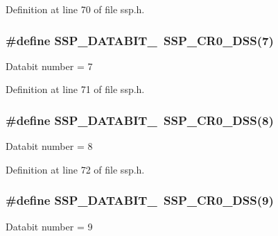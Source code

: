 Definition at line 70 of file ssp.\+h.

\subsubsection[{\texorpdfstring{S\+S\+P\+\_\+\+D\+A\+T\+A\+B\+I\+T\+\_\+7}{SSP_DATABIT_7}}]{\setlength{\rightskip}{0pt plus 5cm}\#define S\+S\+P\+\_\+\+D\+A\+T\+A\+B\+I\+T\+\_~{\bf S\+S\+P\+\_\+\+C\+R0\+\_\+\+D\+SS}(7)}\hypertarget{group___s_s_p___public___macros_ga22e347ea7a0a898ff97b6ca200aa5cd0}{}\label{group___s_s_p___public___macros_ga22e347ea7a0a898ff97b6ca200aa5cd0}
Databit number = 7 

Definition at line 71 of file ssp.\+h.

\subsubsection[{\texorpdfstring{S\+S\+P\+\_\+\+D\+A\+T\+A\+B\+I\+T\+\_\+8}{SSP_DATABIT_8}}]{\setlength{\rightskip}{0pt plus 5cm}\#define S\+S\+P\+\_\+\+D\+A\+T\+A\+B\+I\+T\+\_~{\bf S\+S\+P\+\_\+\+C\+R0\+\_\+\+D\+SS}(8)}\hypertarget{group___s_s_p___public___macros_gad5351b3c8a625149e6ff44bf96c0c71b}{}\label{group___s_s_p___public___macros_gad5351b3c8a625149e6ff44bf96c0c71b}
Databit number = 8 

Definition at line 72 of file ssp.\+h.

\subsubsection[{\texorpdfstring{S\+S\+P\+\_\+\+D\+A\+T\+A\+B\+I\+T\+\_\+9}{SSP_DATABIT_9}}]{\setlength{\rightskip}{0pt plus 5cm}\#define S\+S\+P\+\_\+\+D\+A\+T\+A\+B\+I\+T\+\_~{\bf S\+S\+P\+\_\+\+C\+R0\+\_\+\+D\+SS}(9)}\hypertarget{group___s_s_p___public___macros_ga63076fc45604c634c7935aa8310d9a4d}{}\label{group___s_s_p___public___macros_ga63076fc45604c634c7935aa8310d9a4d}
Databit number = 9 

